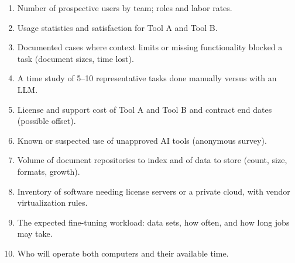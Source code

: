 
\begin{enumerate}
  \item Number of prospective users by team; roles and labor rates.
  \item Usage statistics and satisfaction for Tool A and Tool B.
  \item Documented cases where context limits or missing functionality blocked a task
    (document sizes, time lost).
  \item A time study of 5--10 representative tasks done manually versus with an LLM.
  \item License and support cost of Tool A and Tool B and contract end dates (possible offset).
  \item Known or suspected use of unapproved AI tools (anonymous survey).
  \item Volume of document repositories to index and of data to store (count, size, formats,
    growth).
  \item Inventory of software needing license servers or a private cloud, with vendor
    virtualization rules.
  \item The expected fine-tuning workload: data sets, how often, and how long jobs may take.
  \item Who will operate both computers and their available time.
\end{enumerate}
